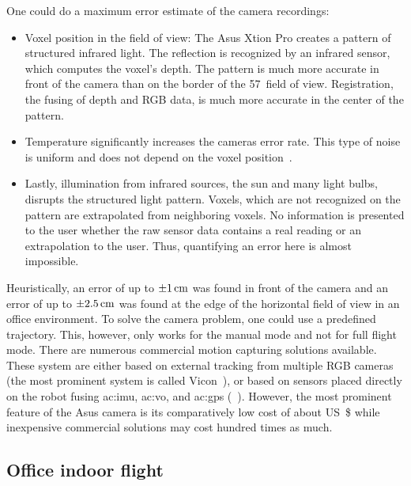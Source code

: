 One could do a maximum error estimate of the camera recordings:
\begin{itemize}
  \item Voxel position in the field of view: The Asus Xtion Pro creates a pattern of structured infrared light. The reflection is recognized by an infrared sensor, which computes the voxel's depth. The pattern is much more accurate in front of the camera than on the border of the 57\degree\ field of view. Registration, the fusing of depth and RGB data, is much more accurate in the center of the pattern.
  \item Temperature significantly increases the cameras error rate. This type of noise is uniform and does not depend on the voxel position~\cite{haggag2013measuring}.
  \item Lastly, illumination from infrared sources, \eg the sun and many light bulbs, disrupts the structured light pattern. Voxels, which are not recognized on the pattern are extrapolated from neighboring voxels. No information is presented to the user whether the raw sensor data contains a real reading or an extrapolation to the user. Thus, quantifying an error here is almost impossible.
\end{itemize}

Heuristically, an error of up to $\unit[\pm 1]{cm}$ was found in front of the camera and an error of up to $\unit[\pm 2.5]{cm}$ was found at the edge of the horizontal field of view in an office environment.
To solve the camera problem, one could use a predefined trajectory.
This, however, only works for the manual mode and not for full flight mode.
There are numerous commercial motion capturing solutions available.
These system are either based on external tracking from multiple RGB cameras (the most prominent system is called Vicon~\cite{windolf2008systematic}), or based on sensors placed directly on the robot fusing \gls{ac:imu}, \gls{ac:vo}, and \gls{ac:gps} (\eg~\cite{tseng2009wireless}).
However, the most prominent feature of the Asus camera is its comparatively low cost of about \unit[120]{US\$} while inexpensive commercial solutions may cost hundred times as much.





\subsection{Office indoor flight}
\label{ssec:perception_results_officeindoorflight}

